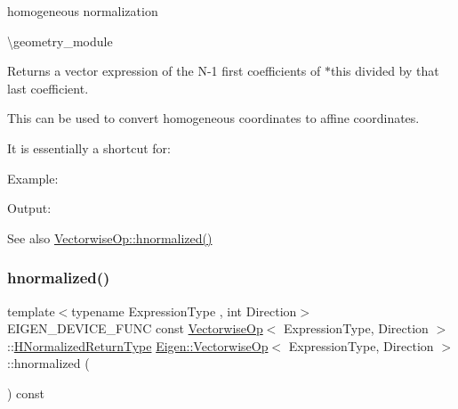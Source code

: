 homogeneous normalization 

\textbackslash{}geometry\+\_\+module

\begin{DoxyReturn}{Returns}
a vector expression of the N-\/1 first coefficients of {\ttfamily $\ast$this} divided by that last coefficient.
\end{DoxyReturn}
This can be used to convert homogeneous coordinates to affine coordinates.

It is essentially a shortcut for\+: 
\begin{DoxyCode}{0}
\end{DoxyCode}


Example\+: 
\begin{DoxyCodeInclude}{0}
\end{DoxyCodeInclude}
 Output\+: 
\begin{DoxyVerbInclude}
\end{DoxyVerbInclude}


\begin{DoxySeeAlso}{See also}
\mbox{\hyperlink{group___geometry___module_ga8d3b6f7178b905b0e4418fd4900c4463}{Vectorwise\+Op\+::hnormalized()}} 
\end{DoxySeeAlso}
\mbox{\label{group___geometry___module_ga8d3b6f7178b905b0e4418fd4900c4463}} 
\subsubsection{\texorpdfstring{hnormalized()}{hnormalized()}\hspace{0.1cm}{\footnotesize\ttfamily [2/2]}}
{\footnotesize\ttfamily template$<$typename Expression\+Type , int Direction$>$ \\
E\+I\+G\+E\+N\+\_\+\+D\+E\+V\+I\+C\+E\+\_\+\+F\+U\+NC const \mbox{\hyperlink{class_eigen_1_1_vectorwise_op}{Vectorwise\+Op}}$<$ Expression\+Type, Direction $>$\+::\mbox{\hyperlink{class_eigen_1_1_cwise_binary_op}{H\+Normalized\+Return\+Type}} \mbox{\hyperlink{class_eigen_1_1_vectorwise_op}{Eigen\+::\+Vectorwise\+Op}}$<$ Expression\+Type, Direction $>$\+::hnormalized (\begin{DoxyParamCaption}{ }\end{DoxyParamCaption}) const\hspace{0.3cm}{\ttfamily [inline]}}



